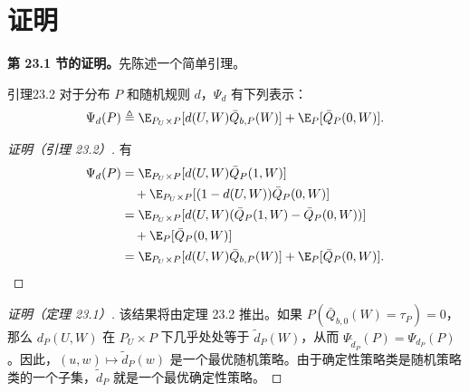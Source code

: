 \section{证明}

\noindent\textbf{第 23.1 节的证明。}先陈述一个简单引理。

\begin{bookresult}{引理}{23.2}
对于分布 $P$ 和随机规则 $d$，$\Psi_d$ 有下列表示：
\[
 \Psi_d(P)\triangleq\E_{P_U\times P}[d(U,W)\bar Q_{b,P}(W)]+\E_P[\bar Q_P(0,W)].
\]
\end{bookresult}

\begin{proof}[证明（引理 23.2）]
有
\[
\begin{aligned}
 \Psi_d(P)&=\E_{P_U\times P}[d(U,W)\bar Q_P(1,W)]\\
 &\quad+\E_{P_U\times P}[(1-d(U,W))\bar Q_P(0,W)]\\
 &=\E_{P_U\times P}[d(U,W)(\bar Q_P(1,W)-\bar Q_P(0,W))]\\
 &\quad+\E_P[\bar Q_P(0,W)]\\
 &=\E_{P_U\times P}[d(U,W)\bar Q_{b,P}(W)]+\E_P[\bar Q_P(0,W)].\qedhere
\end{aligned}
\]
\end{proof}

\begin{proof}[证明（定理 23.1）]
该结果将由定理 23.2 推出。如果 $P(\bar Q_{b,0}(W)=\tau_P)=0$，那么 $d_P(U,W)$ 在 $P_U\times P$ 下几乎处处等于 $\tilde d_P(W)$，从而 $\Psi_{\tilde d_P}(P)=\Psi_{d_P}(P)$。因此，$(u,w)\mapsto\tilde d_P(w)$ 是一个最优随机策略。由于确定性策略类是随机策略类的一个子集，$\tilde d_P$ 就是一个最优确定性策略。
\end{proof}


